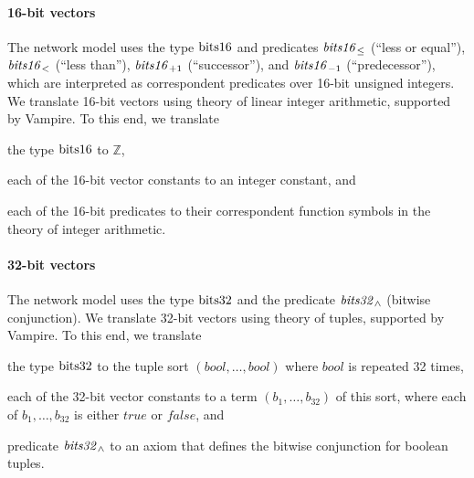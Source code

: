 

\paragraph*{16-bit vectors}%
The network model uses the type $\mathrm{bits16}$ and predicates $\mathit{bits16}_{\le}$ (``less or equal''), $\mathit{bits16}_{<}$ (``less than''), $\mathit{bits16}_{+1}$ (``successor''), and $\mathit{bits16}_{-1}$ (``predecessor''), which are interpreted as correspondent predicates over 16-bit unsigned integers. We translate 16-bit vectors using theory of linear integer arithmetic, supported by Vampire. To this end, we translate
\begin{enumerate*}[label=(\roman*)]
  \item the type $\mathrm{bits16}$ to $\mathbb{Z}$,
  \item each of the 16-bit vector constants to an integer constant, and
  \item each of the 16-bit predicates to their correspondent function symbols in the theory of integer arithmetic.
\end{enumerate*} 

\paragraph*{32-bit vectors}%
The network model uses the type $\mathrm{bits32}$ and the predicate $\mathit{bits32}_\wedge$ (bitwise conjunction). We translate 32-bit vectors using theory of tuples, supported by Vampire. To this end, we translate
\begin{enumerate*}[label=(\roman*)]
  \item the type $\mathrm{bits32}$ to the tuple sort $(\mathit{bool},\ldots,\mathit{bool})$ where $\mathit{bool}$ is repeated 32 times,
  \item each of the 32-bit vector constants to a term $(b_1,\ldots,b_{32})$ of this sort, where each of $b_1,\ldots,b_{32}$ is either $\mathit{true}$ or $\mathit{false}$, and
  \item predicate $\mathit{bits32}_\wedge$ to an axiom that defines the bitwise conjunction for boolean tuples.
\end{enumerate*}

